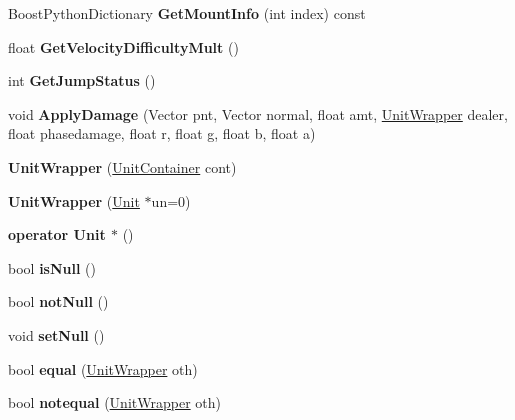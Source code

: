 \begin{DoxyCompactItemize}
\item 
Boost\+Python\+Dictionary {\bfseries Get\+Mount\+Info} (int index) const \hypertarget{classUnitWrapper_a36e13135822d7ecba921b47df16cdc54}{}\label{classUnitWrapper_a36e13135822d7ecba921b47df16cdc54}

\item 
float {\bfseries Get\+Velocity\+Difficulty\+Mult} ()\hypertarget{classUnitWrapper_a19cdf1ec17b094e38105053c02d958cf}{}\label{classUnitWrapper_a19cdf1ec17b094e38105053c02d958cf}

\item 
int {\bfseries Get\+Jump\+Status} ()\hypertarget{classUnitWrapper_af3730802ad24eabd35100c006dce2d97}{}\label{classUnitWrapper_af3730802ad24eabd35100c006dce2d97}

\item 
void {\bfseries Apply\+Damage} (Vector pnt, Vector normal, float amt, \hyperlink{classUnitWrapper}{Unit\+Wrapper} dealer, float phasedamage, float r, float g, float b, float a)\hypertarget{classUnitWrapper_a1658be94bbedbf3f36e8cad343b41d7b}{}\label{classUnitWrapper_a1658be94bbedbf3f36e8cad343b41d7b}

\item 
{\bfseries Unit\+Wrapper} (\hyperlink{classUnitContainer}{Unit\+Container} cont)\hypertarget{classUnitWrapper_a9bab78f4efe44b18949d76338918404e}{}\label{classUnitWrapper_a9bab78f4efe44b18949d76338918404e}

\item 
{\bfseries Unit\+Wrapper} (\hyperlink{classUnit}{Unit} $\ast$un=0)\hypertarget{classUnitWrapper_a5b518c978654268b00e63d5fd64e51fa}{}\label{classUnitWrapper_a5b518c978654268b00e63d5fd64e51fa}

\item 
{\bfseries operator Unit $\ast$} ()\hypertarget{classUnitWrapper_a6720bc6e2402398d32f7df5054f9b7fd}{}\label{classUnitWrapper_a6720bc6e2402398d32f7df5054f9b7fd}

\item 
bool {\bfseries is\+Null} ()\hypertarget{classUnitWrapper_a4f236ed53ae2c3a3570667ff28606804}{}\label{classUnitWrapper_a4f236ed53ae2c3a3570667ff28606804}

\item 
bool {\bfseries not\+Null} ()\hypertarget{classUnitWrapper_afaef5a9d1552bcbad219f87cbc90e8ad}{}\label{classUnitWrapper_afaef5a9d1552bcbad219f87cbc90e8ad}

\item 
void {\bfseries set\+Null} ()\hypertarget{classUnitWrapper_a6ca375e8ba4f7cc3bc71427b83b4c66b}{}\label{classUnitWrapper_a6ca375e8ba4f7cc3bc71427b83b4c66b}

\item 
bool {\bfseries equal} (\hyperlink{classUnitWrapper}{Unit\+Wrapper} oth)\hypertarget{classUnitWrapper_afd3eb75830313a36161656e86bcf871c}{}\label{classUnitWrapper_afd3eb75830313a36161656e86bcf871c}

\item 
bool {\bfseries notequal} (\hyperlink{classUnitWrapper}{Unit\+Wrapper} oth)\hypertarget{classUnitWrapper_a6580e8283ddc048c3d8e7404c3ca3fcf}{}\label{classUnitWrapper_a6580e8283ddc048c3d8e7404c3ca3fcf}

\end{DoxyCompactItemize}
